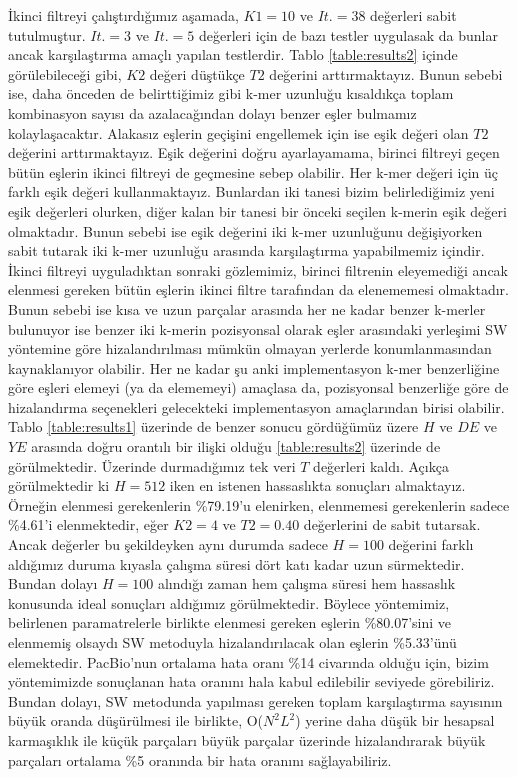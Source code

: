 İkinci filtreyi çalıştırdığımız aşamada, $K1 = 10$ ve $It. = 38$ değerleri sabit tutulmuştur. $It. = 3$ ve $It. = 5$ değerleri için de bazı testler uygulasak da bunlar ancak karşılaştırma amaçlı yapılan testlerdir. Tablo \ref{table:results2} içinde görülebileceği gibi, $K2$ değeri düştükçe $T2$ değerini arttırmaktayız. Bunun sebebi ise, daha önceden de belirttiğimiz gibi k-mer uzunluğu kısaldıkça toplam kombinasyon sayısı da azalacağından dolayı benzer eşler bulmamız kolaylaşacaktır. Alakasız eşlerin geçişini engellemek için ise eşik değeri olan $T2$ değerini arttırmaktayız. Eşik değerini doğru ayarlayamama, birinci filtreyi geçen bütün eşlerin ikinci filtreyi de geçmesine sebep olabilir. Her k-mer değeri için üç farklı eşik değeri kullanmaktayız. Bunlardan iki tanesi bizim belirlediğimiz yeni eşik değerleri olurken, diğer kalan bir tanesi bir önceki seçilen k-merin eşik değeri olmaktadır. Bunun sebebi ise eşik değerini iki k-mer uzunluğunu değişiyorken sabit tutarak iki k-mer uzunluğu arasında karşılaştırma yapabilmemiz içindir. İkinci filtreyi uyguladıktan sonraki gözlemimiz, birinci filtrenin eleyemediği ancak elenmesi gereken bütün eşlerin ikinci filtre tarafından da elenememesi olmaktadır. Bunun sebebi ise kısa ve uzun parçalar arasında her ne kadar benzer k-merler bulunuyor ise benzer iki k-merin pozisyonsal olarak eşler arasındaki yerleşimi SW yöntemine göre hizalandırılması mümkün olmayan yerlerde konumlanmasından kaynaklanıyor olabilir. Her ne kadar şu anki implementasyon k-mer benzerliğine göre eşleri elemeyi (ya da elememeyi) amaçlasa da, pozisyonsal benzerliğe göre de hizalandırma seçenekleri gelecekteki implementasyon amaçlarından birisi olabilir. Tablo \ref{table:results1} üzerinde de benzer sonucu gördüğümüz üzere $H$ ve $DE$ ve $YE$ arasında doğru orantılı bir ilişki olduğu \ref{table:results2} üzerinde de görülmektedir. Üzerinde durmadığımız tek veri $T$ değerleri kaldı. Açıkça görülmektedir ki $H = 512$ iken en istenen hassaslıkta sonuçları almaktayız. Örneğin elenmesi gerekenlerin \%79.19'u elenirken, elenmemesi gerekenlerin sadece \%4.61'i elenmektedir, eğer $K2 = 4$ ve $T2 = 0.40$ değerlerini de sabit tutarsak. Ancak değerler bu şekildeyken aynı durumda sadece $H = 100$ değerini farklı aldığımız duruma kıyasla çalışma süresi dört katı kadar uzun sürmektedir. Bundan dolayı $H = 100$ alındığı zaman hem çalışma süresi hem hassaslık konusunda ideal sonuçları aldığımız görülmektedir. Böylece yöntemimiz, belirlenen paramatrelerle birlikte elenmesi gereken eşlerin \%80.07'sini ve elenmemiş olsaydı SW metoduyla hizalandırılacak olan eşlerin \%5.33'ünü elemektedir. PacBio'nun ortalama hata oranı \%14 civarında olduğu için, bizim yöntemimizde sonuçlanan hata oranını hala kabul edilebilir seviyede görebiliriz. Bundan dolayı, SW metodunda yapılması gereken toplam karşılaştırma sayısının büyük oranda düşürülmesi ile birlikte, O($N^2L^2$) yerine daha düşük bir hesapsal karmaşıklık ile küçük parçaları büyük parçalar üzerinde hizalandırarak büyük parçaları ortalama \%5 oranında bir hata oranını sağlayabiliriz.
